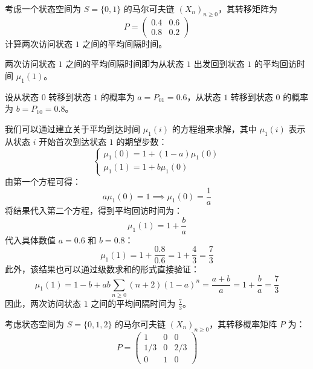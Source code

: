 \begin{questions}
\question 考虑一个状态空间为 $S = \{0, 1\}$ 的马尔可夫链 $(X_n)_{n \geqslant 0}$，其转移矩阵为
\[
P = \begin{pmatrix} 0.4 & 0.6 \\ 0.8 & 0.2 \end{pmatrix}
\]
计算两次访问状态 $1$ 之间的平均间隔时间。

\begin{solution}
    两次访问状态 $1$ 之间的平均间隔时间即为从状态 $1$ 出发回到状态 $1$ 的平均回访时间 $\mu_1(1)$。

    设从状态 $0$ 转移到状态 $1$ 的概率为 $a = P_{01} = 0.6$，从状态 $1$ 转移到状态 $0$ 的概率为 $b = P_{10} = 0.8$。

    我们可以通过建立关于平均到达时间 $\mu_1(i)$ 的方程组来求解，其中 $\mu_1(i)$ 表示从状态 $i$ 开始首次到达状态 $1$ 的期望步数：
    \[
    \begin{cases} 
    \mu_1(0) = 1 + (1 - a)\mu_1(0) \\
    \mu_1(1) = 1 + b\mu_1(0) 
    \end{cases}
    \]
    由第一个方程可得：
    \[
    a\mu_1(0) = 1 \implies \mu_1(0) = \frac{1}{a}
    \]
    将结果代入第二个方程，得到平均回访时间为：
    \[
    \mu_1(1) = 1 + \frac{b}{a}
    \]
    代入具体数值 $a = 0.6$ 和 $b = 0.8$：
    \[
    \mu_1(1) = 1 + \frac{0.8}{0.6} = 1 + \frac{4}{3} = \frac{7}{3}
    \]
    此外，该结果也可以通过级数求和的形式直接验证：
    \[
    \mu_1(1) = 1 - b + ab \sum_{n \geqslant 0} (n + 2)(1 - a)^n = \frac{a + b}{a} = 1 + \frac{b}{a} = \frac{7}{3}
    \]
    因此，两次访问状态 $1$ 之间的平均间隔时间为 $\frac{7}{3}$。
\end{solution}

\question 考虑状态空间为 $S = \{0, 1, 2\}$ 的马尔可夫链 $(X_n)_{n \geqslant 0}$，其转移概率矩阵 $P$ 为：
\[
P = \begin{pmatrix} 
1 & 0 & 0 \\
1/3 & 0 & 2/3 \\
0 & 1 & 0 
\end{pmatrix}
\]

\end{questions}
